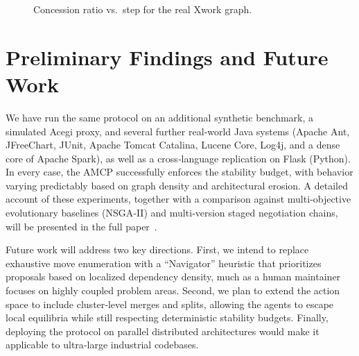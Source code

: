 \documentclass[conference]{IEEEtran}
\begin{document}
\begin{figure}[t]
\centering
{}
\caption{Concession ratio vs.\ step for the real Xwork graph.}
\label{fig:concession_xwork}
\end{figure}

\section{Preliminary Findings and Future Work}
\label{sec:preliminary}

We have run the same protocol on an additional synthetic benchmark, a simulated Acegi proxy, and several further real‑world Java systems (Apache Ant, JFreeChart, JUnit, Apache Tomcat Catalina, Lucene Core, Log4j, and a dense core of Apache Spark), as well as a cross‑language replication on Flask (Python). In every case, the AMCP successfully enforces the stability budget, with behavior varying predictably based on graph density and architectural erosion. A detailed account of these experiments, together with a comparison against multi‑objective evolutionary baselines (NSGA‑II) and multi‑version staged negotiation chains, will be presented in the full paper~\cite{Ibrahim2025full}.

Future work will address two key directions. First, we intend to replace exhaustive move enumeration with a ``Navigator'' heuristic that prioritizes proposals based on localized dependency density, much as a human maintainer focuses on highly coupled problem areas. Second, we plan to extend the action space to include cluster‑level merges and splits, allowing the agents to escape local equilibria while still respecting deterministic stability budgets. Finally, deploying the protocol on parallel distributed architectures would make it applicable to ultra‑large industrial codebases.
\end{document}
